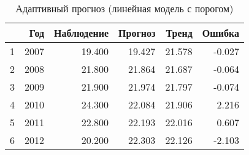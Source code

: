 \begin{table}[ht]
\centering
\begin{tabular}{rrrrrr}
  \hline
 & Год & Наблюдение & Прогноз & Тренд & Ошибка \\ 
  \hline
1 & 2007 & 19.400 & 19.427 & 21.578 & -0.027 \\ 
  2 & 2008 & 21.800 & 21.864 & 21.687 & -0.064 \\ 
  3 & 2009 & 21.900 & 21.974 & 21.797 & -0.074 \\ 
  4 & 2010 & 24.300 & 22.084 & 21.906 & 2.216 \\ 
  5 & 2011 & 22.800 & 22.193 & 22.016 & 0.607 \\ 
  6 & 2012 & 20.200 & 22.303 & 22.126 & -2.103 \\ 
   \hline
\end{tabular}
\caption{Адаптивный прогноз (линейная модель с порогом)} 
\label{table:lin-fit-adapt-prediction}
\end{table}
